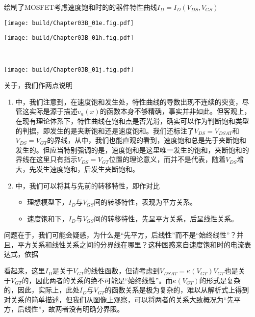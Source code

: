 {}绘制了MOSFET考虑速度饱和时的的器件特性曲线$I_D=I_D(V_{DS},V_{GS})$
\begin{Figure}[MOSFET的速度饱和]
    \begin{FigureSub}
        \texttt{[image: build/Chapter03B\_01e.fig.pdf]}
    \end{FigureSub}
    \begin{FigureSub}
        \texttt{[image: build/Chapter03B\_01h.fig.pdf]}
    \end{FigureSub}\\ \vspace{0.2cm}
    \begin{FigureSub}
        \texttt{[image: build/Chapter03B\_01j.fig.pdf]}
    \end{FigureSub}
\end{Figure}
关于，我们作两点说明
\begin{enumerate}
    \item {}中，我们注意到，在速度饱和发生处，特性曲线的导数出现不连续的突变，尽管这实际是源于描述$v_n(x)$的函数本身不够精确，事实并非如此。但客观上，在现有理论体系下，特性曲线在饱和点是否光滑，确实可以作为判断饱和类型的判据，即发生的是夹断饱和还是速度饱和。我们还标注了$V_{DS}=V_{DSAT}$和$V_{DS}=V_{GT}$的界线，从中，我们也能直观的看到，速度饱和总是先于夹断饱和发生的。但应当特别强调的是，速度饱和是这里唯一发生的饱和，夹断饱和的界线在这里只有指示$V_{DS}=V_{GT}$位置的理论意义，而并不是代表，随着$V_{DS}$增大，先发生速度饱和，后发生夹断饱和。
    \item {}中，我们可以将其与先前的转移特性，即作对比
    \begin{itemize}
        \item 理想模型下，$I_D$与$V_{GS}$间的转移特性，表现为平方关系。\vspace{0.2cm}
        \item 速度饱和下，$I_D$与$V_{GS}$间的转移特性，先呈平方关系，后呈线性关系。
    \end{itemize}
\end{enumerate}
问题在于，我们可能会疑惑，为什么是“先平方，后线性”而不是“始终线性”？并且，平方关系和线性关系之间的分界线在哪里？这种困惑来自速度饱和时的电流表达式，依据
看起来，这里$I_D$是关于$V_{GT}$的线性函数，但请考虑到$V_{DSAT}=\kappa(V_{GT})V_{GT}$也是关于$V_{GT}$的，因此两者的关系的绝不可能是“始终线性”。而$\kappa(V_{GT})$的形式是复杂的，因此，实际上，此处$I_D$与$V_{GT}$的函数关系是极为复杂的，难以从解析式上得到对关系的简单描述，但我们从图像上观察，可以将两者的关系大致概况为“先平方，后线性”，故两者没有明确分界限。

